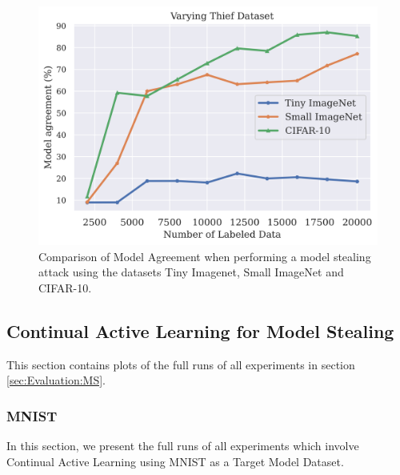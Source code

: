\begin{figure}[h]
    \centering
    \includegraphics[width=0.8\linewidth]{images/results_CALMS/effect_dataset.png}
    \caption{Comparison of Model Agreement when performing a model stealing attack using the datasets Tiny Imagenet, Small ImageNet and CIFAR-10.}
    \label{fig:Appendix:MS:ActiveThief:EffectDataset}
\end{figure}

\clearpage


\subsection{Continual Active Learning for Model Stealing}
\label{sec:Appendix:CALMS}
This section contains plots of the full runs of all experiments in section \ref{sec:Evaluation:MS}.

\subsubsection{MNIST}
\label{sec:Appendix:CALMS:MNIST}
In this section, we present the full runs of all experiments which involve Continual Active Learning using MNIST as a Target Model Dataset.

